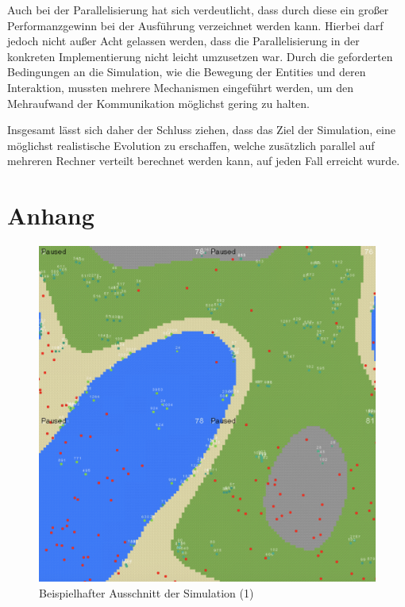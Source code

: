 \documentclass[course=erap]{aspdoc}
\begin{document}
Auch bei der Parallelisierung hat sich verdeutlicht, dass durch diese ein großer Performanzgewinn bei der Ausführung verzeichnet werden kann. Hierbei darf jedoch nicht außer Acht gelassen werden, dass die Parallelisierung in der konkreten Implementierung nicht leicht umzusetzen war. Durch die geforderten Bedingungen an die Simulation, wie die Bewegung der Entities und deren Interaktion, mussten mehrere Mechanismen eingeführt werden, um den Mehraufwand der Kommunikation möglichst gering zu halten.

Insgesamt lässt sich daher der Schluss ziehen, dass das Ziel der Simulation, eine möglichst realistische Evolution zu erschaffen, welche zusätzlich parallel auf mehreren Rechner verteilt berechnet werden kann, auf jeden Fall erreicht wurde.

\newpage
\section{Anhang}
\begin{figure} [h]
    \centering
    \includegraphics[width=\textwidth]{res/ergebnisse-simulation-1.png}
    \caption{Beispielhafter Ausschnitt der Simulation (1)}
    \label{fig:ergebnisse-simulation-1}
\end{figure}
\end{document}
